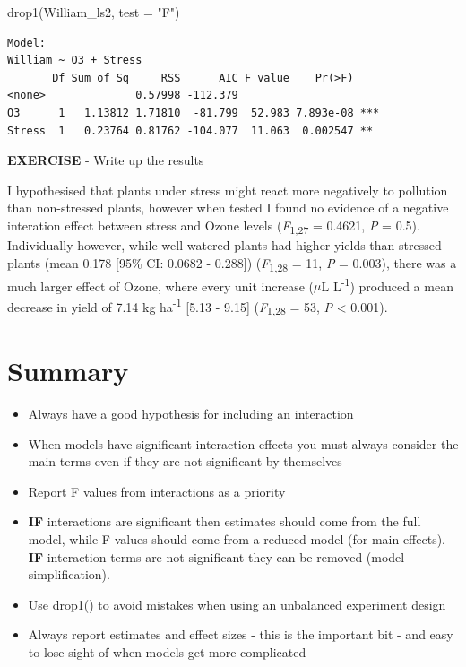 \documentclass[
]{book}
\newenvironment{Shaded}{\begin{snugshade}}{\end{snugshade}}
\newcommand{\AttributeTok}[1]{\textcolor[rgb]{0.77,0.63,0.00}{#1}}
\newcommand{\FunctionTok}[1]{\textcolor[rgb]{0.00,0.00,0.00}{#1}}
\newcommand{\NormalTok}[1]{#1}
\newcommand{\StringTok}[1]{\textcolor[rgb]{0.31,0.60,0.02}{#1}}
\begin{document}
\begin{Shaded}
\begin{Highlighting}[]
\FunctionTok{drop1}\NormalTok{(William\_ls2, }\AttributeTok{test =} \StringTok{"F"}\NormalTok{)}
\end{Highlighting}
\end{Shaded}

\begin{verbatim}
Model:
William ~ O3 + Stress
       Df Sum of Sq     RSS      AIC F value    Pr(>F)    
<none>              0.57998 -112.379                      
O3      1   1.13812 1.71810  -81.799  52.983 7.893e-08 ***
Stress  1   0.23764 0.81762 -104.077  11.063  0.002547 ** 
\end{verbatim}

\textbf{EXERCISE} - Write up the results

I hypothesised that plants under stress might react more negatively to pollution than non-stressed plants, however when tested I found no evidence of a negative interation effect between stress and Ozone levels (\emph{F}\textsubscript{1,27} = 0.4621, \emph{P} = 0.5). Individually however, while well-watered plants had higher yields than stressed plants (mean 0.178 {[}95\% CI: 0.0682 - 0.288{]}) (\emph{F}\textsubscript{1,28} = 11, \emph{P} = 0.003), there was a much larger effect of Ozone, where every unit increase (\(\mu\)L L\textsuperscript{-1}) produced a mean decrease in yield of 7.14 kg ha\textsuperscript{-1} {[}5.13 - 9.15{]} (\emph{F}\textsubscript{1,28} = 53, \emph{P} \textless{} 0.001).

\hypertarget{summary-7}{%
\section{Summary}\label{summary-7}}

\begin{itemize}
\item
  Always have a good hypothesis for including an interaction
\item
  When models have significant interaction effects you must always consider the main terms even if they are not significant by themselves
\item
  Report F values from interactions as a priority
\item
  \textbf{IF} interactions are significant then estimates should come from the full model, while F-values should come from a reduced model (for main effects). \textbf{IF} interaction terms are not significant they can be removed (model simplification).
\item
  Use drop1() to avoid mistakes when using an unbalanced experiment design
\item
  Always report estimates and effect sizes - this is the important bit - and easy to lose sight of when models get more complicated
\end{itemize}
\end{document}
